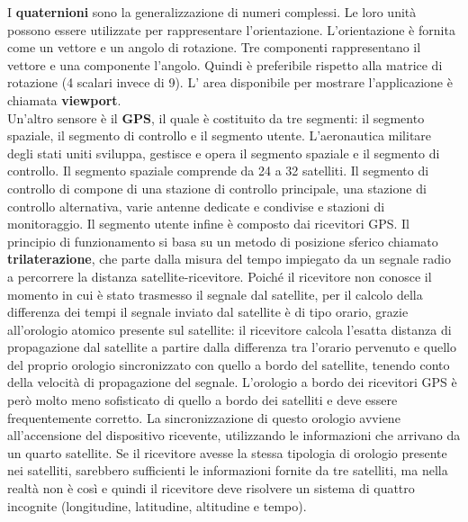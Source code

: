 I \textbf{quaternioni} sono la generalizzazione di numeri complessi. Le loro unità possono essere utilizzate per rappresentare l'orientazione. L'orientazione è fornita come un vettore e un angolo di rotazione. Tre componenti rappresentano il vettore e una componente l'angolo. Quindi è preferibile rispetto alla matrice di rotazione (4 scalari invece di 9). L' area disponibile per mostrare l'applicazione è chiamata \textbf{viewport}. \\Un'altro sensore è il \textbf{GPS}, il quale è costituito da tre segmenti: il segmento spaziale, il segmento di controllo e il segmento utente. L'aeronautica militare degli stati uniti sviluppa, gestisce e opera il segmento spaziale e il segmento di controllo. Il segmento spaziale comprende da 24 a 32 satelliti. Il segmento di controllo di compone di una stazione di controllo principale, una stazione di controllo alternativa, varie antenne dedicate e condivise e stazioni di monitoraggio. Il segmento utente infine è composto dai ricevitori GPS. Il principio di funzionamento si basa su un metodo di posizione sferico chiamato \textbf{trilaterazione}, che parte dalla misura del tempo impiegato da un segnale radio a percorrere la distanza satellite-ricevitore. Poiché il ricevitore non conosce il momento in cui è stato trasmesso il segnale dal satellite, per il calcolo della differenza dei tempi il segnale inviato dal satellite è di tipo orario, grazie all'orologio atomico presente sul satellite: il ricevitore calcola l'esatta distanza di propagazione dal satellite a partire dalla differenza tra l'orario pervenuto e quello del proprio orologio sincronizzato con quello a bordo del satellite, tenendo conto della velocità di propagazione del segnale. L'orologio a bordo dei ricevitori GPS è però molto meno sofisticato di quello a bordo dei satelliti e deve essere frequentemente corretto. La sincronizzazione di questo orologio avviene all'accensione del dispositivo ricevente, utilizzando le informazioni che arrivano da un quarto satellite. Se il ricevitore avesse la stessa tipologia di orologio presente nei satelliti, sarebbero sufficienti le informazioni fornite da tre satelliti, ma nella realtà non è così e quindi il ricevitore deve risolvere un sistema di quattro incognite (longitudine, latitudine, altitudine e tempo).
